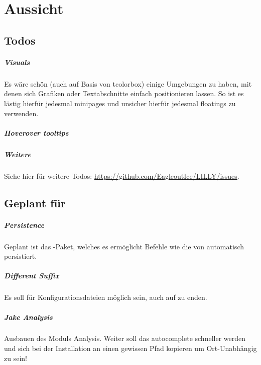 \chapter{Aussicht}

\section{Todos}
\paragraph{Visuals}
Es wäre schön (auch auf Basis von tcolorbox) einige Umgebungen zu haben, mit denen sich Grafiken oder Textabschnitte einfach positionieren lassen. So ist es lästig hierfür jedesmal minipages und unsicher hierfür jedesmal floatings zu verwenden.

\paragraph{Hoverover tooltips}


\paragraph{Weitere}
Siehe hier für weitere Todos: \url{https://github.com/EagleoutIce/LILLY/issues}.

\section{Geplant für \small{}}

\paragraph{Persistence}
Geplant ist das -Paket, welches es ermöglicht Befehle wie die von  automatisch persistiert.

\paragraph{Different Suffix}
Es soll für Konfigurationsdateien möglich sein, auch auf  zu enden.

\paragraph{Jake Analysis}
Ausbauen des \Jake[-]Moduls Analysis. Weiter soll das autocomplete schneller werden und sich \Jake bei der Installation an einen gewissen Pfad kopieren um Ort-Unabhängig zu sein!

